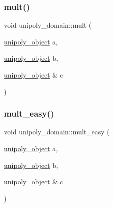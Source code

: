 \mbox{\label{classunipoly__domain_a0071f939bb75d6ee6a09c4029d3d34c1}} 
\subsubsection{\texorpdfstring{mult()}{mult()}}
{\footnotesize\ttfamily void unipoly\+\_\+domain\+::mult (\begin{DoxyParamCaption}\item[{\mbox{\hyperlink{galois_8h_a77ca58de3d2da6172242493dd9c8aaa8}{unipoly\+\_\+object}}}]{a,  }\item[{\mbox{\hyperlink{galois_8h_a77ca58de3d2da6172242493dd9c8aaa8}{unipoly\+\_\+object}}}]{b,  }\item[{\mbox{\hyperlink{galois_8h_a77ca58de3d2da6172242493dd9c8aaa8}{unipoly\+\_\+object}} \&}]{c }\end{DoxyParamCaption})}

\mbox{\label{classunipoly__domain_a99f9557c655bdee8976512e0444b502a}} 
\subsubsection{\texorpdfstring{mult\+\_\+easy()}{mult\_easy()}}
{\footnotesize\ttfamily void unipoly\+\_\+domain\+::mult\+\_\+easy (\begin{DoxyParamCaption}\item[{\mbox{\hyperlink{galois_8h_a77ca58de3d2da6172242493dd9c8aaa8}{unipoly\+\_\+object}}}]{a,  }\item[{\mbox{\hyperlink{galois_8h_a77ca58de3d2da6172242493dd9c8aaa8}{unipoly\+\_\+object}}}]{b,  }\item[{\mbox{\hyperlink{galois_8h_a77ca58de3d2da6172242493dd9c8aaa8}{unipoly\+\_\+object}} \&}]{c }\end{DoxyParamCaption})}

\mbox{\label{classunipoly__domain_a628113bead6a494ce25e7bac8d989c75}} 
